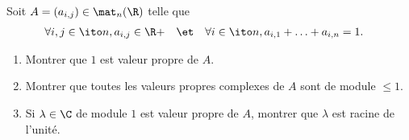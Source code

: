 \begin{enonce}
\begin{exercise}[ID={RMS123 E582, Mines PSI},subtitle={},tags={}, difficulty={0}]
Soit $A=\left( a_{i,j} \right)\in\mat_n(\R)$ telle que
\begin{align*}
  \forall i,j\in\ito n&, a_{i,j}\in\R+&
  &\et&
  \forall i\in\ito n &, a_{i,1}+\dotsc+a_{i,n}=1.
\end{align*}
\begin{enumerate}
  \item Montrer que $1$ est valeur propre de $A$.
  \item Montrer que toutes les valeurs propres complexes de $A$ sont de module $\leq 1$.
  \item Si $\lambda\in\C$ de module $1$ est valeur propre de $A$, montrer que $\lambda$ est racine de l'unité.
\end{enumerate}
\end{exercise}
\begin{solution}
\end{solution}
\end{enonce}
